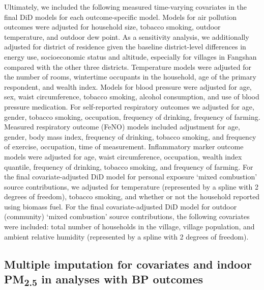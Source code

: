 \documentclass[
  letterpaper,
  DIV=11,
  numbers=noendperiod]{scrartcl}
\begin{document}
Ultimately, we included the following measured time-varying covariates
in the final DiD models for each outcome-specific model. Models for air
pollution outcomes were adjusted for household size, tobacco smoking,
outdoor temperature, and outdoor dew point. As a sensitivity analysis,
we additionally adjusted for district of residence given the baseline
district-level differences in energy use, socioeconomic status and
altitude, especially for villages in Fangshan compared with the other
three districts. Temperature models were adjusted for the number of
rooms, wintertime occupants in the household, age of the primary
respondent, and wealth index. Models for blood pressure were adjusted
for age, sex, waist circumference, tobacco smoking, alcohol consumption,
and use of blood pressure medication. For self-reported respiratory
outcomes we adjusted for age, gender, tobacco smoking, occupation,
frequency of drinking, frequency of farming. Measured respiratory
outcome (FeNO) models included adjustment for age, gender, body mass
index, frequency of drinking, tobacco smoking, and frequency of
exercise, occupation, time of measurement. Inflammatory marker outcome
models were adjusted for age, waist circumference, occupation, wealth
index quantile, frequency of drinking, tobacco smoking, and frequency of
farming. For the final covariate-adjusted DiD model for personal
exposure `mixed combustion' source contributions, we adjusted for
temperature (represented by a spline with 2 degrees of freedom), tobacco
smoking, and whether or not the household reported using biomass fuel.
For the final covariate-adjusted DiD model for outdoor (community)
`mixed combustion' source contributions, the following covariates were
included: total number of households in the village, village population,
and ambient relative humidity (represented by a spline with 2 degrees of
freedom).

\subsection{\texorpdfstring{Multiple imputation for covariates and
indoor PM\textsubscript{2.5} in analyses with BP
outcomes}{Multiple imputation for covariates and indoor PM2.5 in analyses with BP outcomes}}\label{multiple-imputation-for-covariates-and-indoor-pm2.5-in-analyses-with-bp-outcomes}
\end{document}
